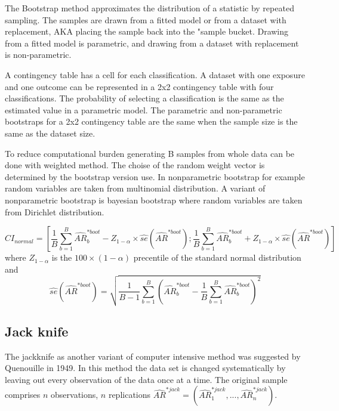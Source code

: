 The Bootstrap method approximates the distribution of a statistic by repeated sampling. The samples are drawn from a fitted model or from a dataset with replacement, AKA placing the sample back into the "sample bucket. Drawing from a fitted model is parametric, and drawing from a dataset with replacement is non-parametric.\cite{Pirikahu2016BayesianMO} 

A contingency table has a cell for each classification. A dataset with one exposure and one outcome can be represented in a 2x2 contingency table with four classifications. The probability of selecting a classification is the same as the estimated value in a parametric model. The parametric and non-parametric bootstraps for a 2x2 contingency table are the same when the sample size is the same as the dataset size.\cite{Pirikahu2016BayesianMO} 

To reduce computational burden generating B samples from whole data can be done with weighted method. The choise of the random weight vector is determined by the bootstrap version use. In nonparametric bootstrap for example random variables are taken from multinomial distribution. A variant of nonparametric bootstrap is bayesian bootstrap where random variables are taken from Dirichlet distribution. \cite{LehnertBatar2006ComparisonOC}

\begin{equation}
    CI_{normal} = [\frac{1}{B}\sum_{b=1}^{B}\hat{AR}_b^{*boot}-Z_{1-\alpha}\times\hat{se}(\hat{AR}^{*boot});\frac{1}{B}\sum_{b=1}^{B}\hat{AR}_b^{*boot}+Z_{1-\alpha}\times\hat{se}(\hat{AR}^{*boot})]
\end{equation} where $Z_{1-\alpha}$ is the $100\times(1-\alpha)$ precentile of the standard normal distribution and
\begin{equation}
    \hat{se}(\hat{AR}^{*boot})=\sqrt{\frac{1}{B-1}\sum_{b=1}^{B}(\hat{AR}_b^{*boot}-\frac{1}{B}\sum_{b=1}^{B}\hat{AR}_b^{*boot})^2}
\end{equation}
\cite{LehnertBatar2006ComparisonOC}

\subsection{Jack knife}
The jackknife as another variant of computer intensive method was suggested by Quenouille in 1949. In this method the data set is changed systematically by leaving out every observation of the data once at a time. The original sample comprises $n$ observations, $n$ replications $\hat{AR}^{*jack} = (\hat{AR}_1^{*jack}, ..., \hat{AR}_n^{*jack})$. \cite{LehnertBatar2006ComparisonOC}

